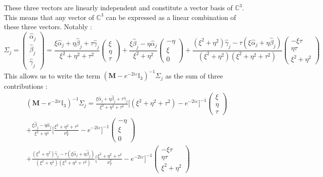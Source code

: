 These three vectors are linearly independent and constitute a vector basis of $\mathbb{C}^3$. This means that any vector of $\mathbb{C}^3$ can be expressed as a linear combination of these three vectors. Notably :
\begin{equation}
\Sigma_j=
    \begin{pmatrix}
    \hat{\alpha}_j\\ \hat{\beta}_j\\ \hat{\gamma}_j
    \end{pmatrix}
    = \frac{\xi\hat{\alpha}_j+\eta\hat{\beta}_j+\tau\hat{\gamma}_j}{\xi^2+\eta^2+\tau^2}\begin{pmatrix}
    \xi \\ \eta \\ \tau 
    \end{pmatrix} + \frac{\xi\hat{\beta}_j-\eta\hat{\alpha}_j}{\xi^2+\eta^2} \begin{pmatrix}
    -\eta \\ \xi \\ 0
    \end{pmatrix} + \frac{(\xi^2+\eta^2)\hat{\gamma}_j-\tau(\xi\hat{\alpha}_j+\eta\hat{\beta}_j)}{(\xi^2+\eta^2)(\xi^2+\eta^2+\tau^2)} \begin{pmatrix}
    -\xi\tau \\ \eta\tau \\ \xi^2+\eta^2
    \end{pmatrix}
\end{equation}
This allows us to write the term $(\mathbf{M}-e^{-2i\varepsilon}\mathbb{I}_3)^{-1} \Sigma_j$ as the sum of three contributions :
\begin{multline}
(\mathbf{M}-e^{-2i\epsilon}\mathbb{I}_3)^{-1} \Sigma_j=\frac{\xi\hat{\alpha}_j+\eta\hat{\beta}_j+\tau\hat{\gamma}_j}{\xi^2+\eta^2+\tau^2}\lbrack(\xi^2+\eta^2+\tau^2)-e^{-2i\varepsilon} \rbrack^{-1} \begin{pmatrix}
    \xi \\ \eta \\ \tau 
    \end{pmatrix} \\
+\frac{\xi\hat{\beta}_j-\eta\hat{\alpha}_j}{\xi^2+\eta^2} \lbrack \frac{\xi^2+\eta^2+\tau^2}{\nu_T^2}-e^{-2i\varepsilon} \rbrack^{-1} \begin{pmatrix}
    -\eta \\ \xi \\ 0
    \end{pmatrix}\\
    +\frac{(\xi^2+\eta^2)\hat{\gamma}_j-\tau(\xi\hat{\alpha}_j+\eta\hat{\beta}_j)}{(\xi^2+\eta^2)(\xi^2+\eta^2+\tau^2)} \lbrack \frac{\xi^2+\eta^2+\tau^2}{\nu_T^2}-e^{-2i\varepsilon} \rbrack^{-1} \begin{pmatrix}
    -\xi\tau \\ \eta\tau \\ \xi^2+\eta^2
    \end{pmatrix}
    \label{invspectre}
\end{multline}
